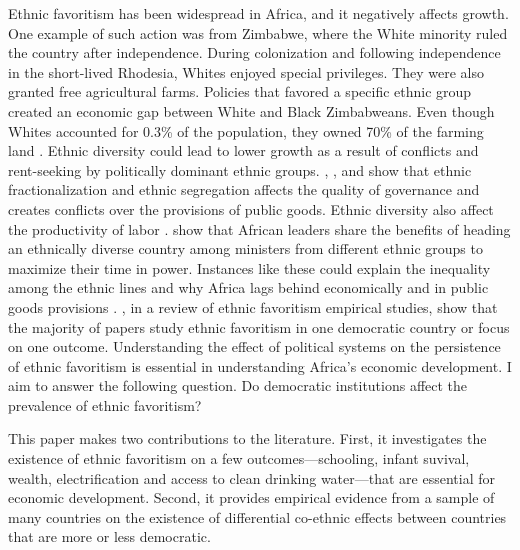 \documentclass{wptemp}
\begin{document}
Ethnic favoritism has been widespread in Africa, and it negatively affects growth. One example of such action was from Zimbabwe, where the White minority ruled the country after independence. During colonization and following independence in the short-lived Rhodesia, Whites enjoyed special privileges. They were also granted free agricultural farms. Policies that favored a specific ethnic group created an economic gap between White and Black Zimbabweans. Even though Whites accounted for 0.3\% of the population, they owned 70\% of the farming land \citep{batha_2000}. Ethnic diversity could lead to lower growth as a result of conflicts and rent-seeking by politically dominant ethnic groups. \citet{la1999quality}, \citet{alesina1999public}, \citet{alesina2003fractionalization} and \citet{alesina2011segregation} show that ethnic fractionalization and ethnic segregation affects the quality of governance and creates conflicts over the provisions of public goods. Ethnic diversity also affect the productivity of labor \citep{ lazear1999culture, habyarimana2007does, hjort2014ethnic}. \citet{francois2015power} show that African leaders share the benefits of heading an ethnically diverse country among ministers from different ethnic groups to maximize their time in power. Instances like these could explain the inequality among the ethnic lines and why Africa lags behind economically and in public goods provisions \citep{easterly1997africa, alesina2005ethnic, miguel2005ethnic, glennerster2013collective}.  \citet{golden2013distributive}, in a review of ethnic favoritism empirical studies, show that the majority of papers study ethnic favoritism in one democratic country or focus on one outcome.  Understanding the effect of political systems on the persistence of ethnic favoritism is essential in understanding Africa's economic development. I aim to answer the following question. Do democratic institutions affect the prevalence of ethnic favoritism?

This paper makes two contributions to the literature. First, it investigates the existence of ethnic favoritism on a few outcomes---schooling, infant suvival, wealth, electrification and access to clean drinking water---that are essential for economic development. Second, it provides empirical evidence from a sample of many countries on the existence of differential co-ethnic effects between countries that are more or less democratic.
\end{document}
